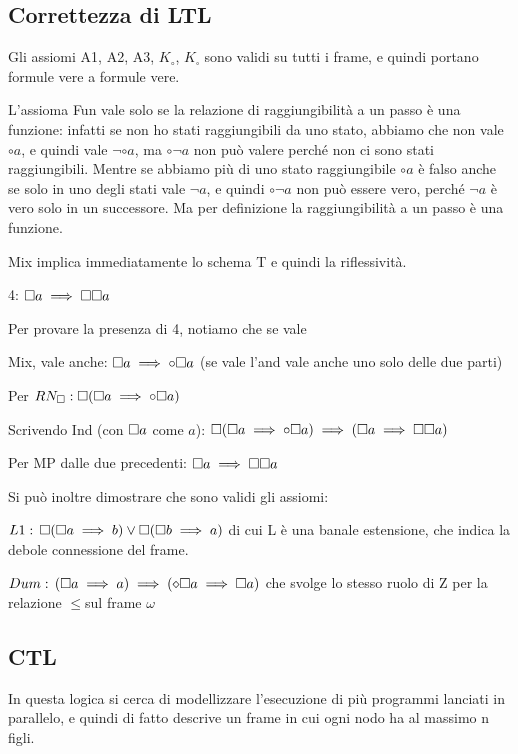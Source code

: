 \subsection{Correttezza di LTL}

Gli assiomi A1, A2, A3, $K_{\circ}$, $K_{\square}$ sono validi su
tutti i frame, e quindi portano formule vere a formule vere.

L'assioma Fun vale solo se la relazione di raggiungibilità a un passo
è una funzione: infatti se non ho stati raggiungibili da uno stato,
abbiamo che non vale $\circ a$, e quindi vale $\neg\circ a$, ma
$\circ\neg a$ non può valere perché non ci sono stati raggiungibili.
Mentre se abbiamo più di uno stato raggiungibile $\circ a$ è falso
anche se solo in uno degli stati vale $\neg a$, e quindi $\circ\neg a$
non può essere vero, perché $\neg a$ è vero solo in un successore.
Ma per definizione la raggiungibilità a un passo è una funzione.

Mix implica immediatamente lo schema T e quindi la riflessività.

4: $\square a\implies\square\square a$

Per provare la presenza di 4, notiamo che se vale 

Mix, vale anche: $\square a\implies\circ\square a$ (se vale l'and vale anche
uno solo delle due parti)

Per $RN_{\square}:\square(\square a\implies\circ\square a)$

Scrivendo Ind (con $\square a$ come $a$): $\square(\square a\implies\circ\square a)\implies(\square a\implies\square\square a)$ 

Per MP dalle due precedenti: $\square a\implies\square\square a$

Si può inoltre dimostrare che sono validi gli assiomi:

$L1:\,\square(\square a\implies b)\vee\square(\square b\implies a)$ di cui
L è una banale estensione, che indica la debole connessione del frame.

$Dum:\,(\square a\implies a)\implies(\diamond\square a\implies\square a)$ che svolge
lo stesso ruolo di Z per la relazione $\leq$sul frame $\omega$


\subsection{CTL}

In questa logica si cerca di modellizzare l'esecuzione di più programmi
lanciati in parallelo, e quindi di fatto descrive un frame in cui
ogni nodo ha al massimo n figli.

